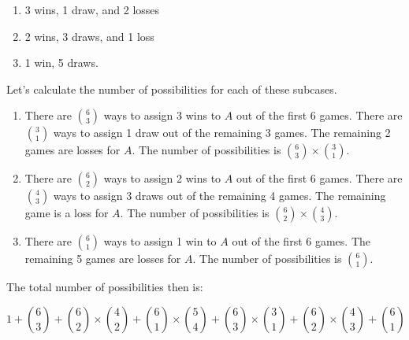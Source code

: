 \begin{enumerate}[label=(\alph*)]
    \begin{enumerate}[label=2.\arabic*.]
      \item 3 wins, 1 draw, and 2 losses
      \item 2 wins, 3 draws, and 1 loss
      \item 1 win, 5 draws.
    \end{enumerate}
  
    Let's calculate the number of possibilities for each of these subcases.
  
    \begin{enumerate}[label=2.\arabic*.]
      \item There are ${6 \choose 3}$ ways to assign 3 wins to $A$ out of the first 6 games. There are ${3 \choose 1}$ ways to assign 1 draw out of the remaining 3 games. The remaining 2 games are losses for $A$. The number of possibilities is ${6 \choose 3} \times {3 \choose 1}$.
      \item There are ${6 \choose 2}$ ways to assign 2 wins to $A$ out of the first 6 games. There are ${4 \choose 3}$ ways to assign 3 draws out of the remaining 4 games. The remaining game is a loss for $A$. The number of possibilities is ${6 \choose 2} \times {4 \choose 3}$.
      \item There are ${6 \choose 1}$ ways to assign 1 win to $A$ out of the first 6 games. The remaining 5 games are losses for $A$. The number of possibilities is ${6 \choose 1}$.
    \end{enumerate}
  
    The total number of possibilities then is:
    
    $$ 1 + {6 \choose 3} + {6 \choose 2} \times {4 \choose 2} + {6 \choose 1} \times {5 \choose 4} + {6 \choose 3} \times {3 \choose 1} + {6 \choose 2} \times {4 \choose 3} + {6 \choose 1} $$
  
  \end{enumerate}